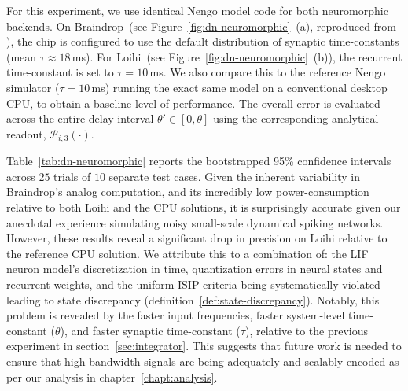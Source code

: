 For this experiment, we use identical Nengo model code for both neuromorphic backends.
On Braindrop~(see Figure~\ref{fig:dn-neuromorphic}~(a), reproduced from \citet[][Figure~16]{braindrop2019}),
the chip is configured to use the default distribution of synaptic time-constants (mean $\tau \approx 18$\,ms).
For Loihi~(see Figure~\ref{fig:dn-neuromorphic}~(b)), the recurrent time-constant is set to $\tau=10$\,ms.
We also compare this to the reference Nengo simulator ($\tau=10$\,ms) running the exact same model on a conventional desktop CPU, to obtain a baseline level of performance.
The overall error is evaluated across the entire delay interval $\theta' \in [0, \theta]$ using the corresponding analytical readout, $\mathcal{P}_{i, 3}(\cdot)$.

Table~\ref{tab:dn-neuromorphic} reports the bootstrapped 95\% confidence intervals across $25$ trials of $10$ separate test cases.
Given the inherent variability in Braindrop's analog computation, and its incredibly low power-consumption relative to both Loihi and the CPU solutions, it is surprisingly accurate given our anecdotal experience simulating noisy small-scale dynamical spiking networks.
However, these results reveal a significant drop in precision on Loihi relative to the reference CPU solution.
We attribute this to a combination of: the LIF neuron model's discretization in time, quantization errors in neural states and recurrent weights, and the uniform ISIP criteria being systematically violated leading to state discrepancy (definition~\ref{def:state-discrepancy}).
Notably, this problem is revealed by the faster input frequencies, faster system-level time-constant ($\theta$), and faster synaptic time-constant ($\tau$), relative to the previous experiment in section~\ref{sec:integrator}.
This suggests that future work is needed to ensure that high-bandwidth signals are being adequately and scalably encoded as per our analysis in chapter~\ref{chapt:analysis}.


